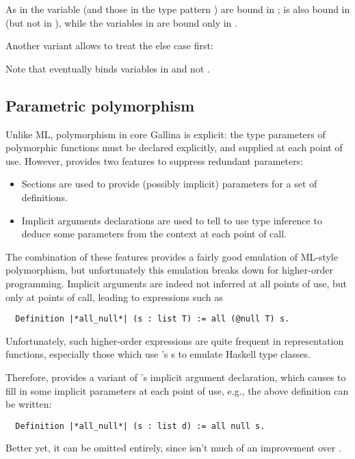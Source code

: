 As in  the variable  (and those in
the type pattern ) are bound in ;  is
also bound in  (but not in ), while the
variables in  are bound only in .

\noindent
Another variant allows to treat the else case first:

\begin{center}
       
\end{center}

Note that  eventually binds variables in 
and not .

\subsection{Parametric polymorphism}\label{ssec:parampoly}

Unlike ML, polymorphism in core Gallina is explicit: the type
parameters of polymorphic  functions must be declared explicitly, and
supplied at each point of use. However, \Coq{} provides two features
to suppress redundant parameters:
\begin{itemize}
\item Sections are used to provide (possibly implicit) parameters for
  a set of definitions.
\item Implicit arguments declarations are used to tell \Coq{} to use
  type inference to deduce some parameters from the context at each
  point of call.
\end{itemize}
The combination of these features provides a fairly good emulation of ML-style
polymorphism, but unfortunately this emulation breaks down for
higher-order programming. Implicit arguments are indeed not inferred
at all points of use, but only at
points of call, leading to  expressions such as
\begin{lstlisting}
  Definition |*all_null*| (s : list T) := all (@null T) s.
\end{lstlisting}
Unfortunately, such higher-order expressions are quite frequent in
representation functions, especially those which use \Coq{}'s
s to emulate Haskell type classes.

Therefore, \ssr{} provides a variant of \Coq{}'s implicit argument
declaration, which  causes \Coq{} to fill in some implicit parameters
at each point of use, e.g., the above definition can be written:
\begin{lstlisting}
  Definition |*all_null*| (s : list d) := all null s.
\end{lstlisting}
Better yet, it can be omitted entirely, since  isn't
much of an improvement over .

